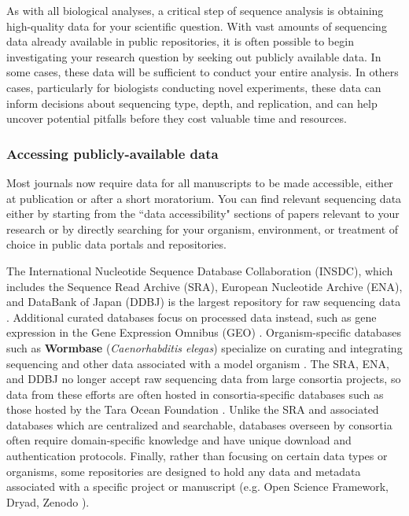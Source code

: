 \documentclass[10pt,letterpaper]{article}
\begin{document}
As with all biological analyses, a critical step of sequence analysis is obtaining high-quality data for your scientific question. 
With vast amounts of sequencing data already available in public repositories, it is often possible to begin investigating your research question by seeking out publicly available data. 
In some cases, these data will be sufficient to conduct your entire analysis. 
In others cases, particularly for biologists conducting novel experiments, these data can inform decisions about sequencing type, depth, and replication, and can help uncover potential pitfalls before they cost valuable time and resources.

\subsubsection*{Accessing publicly-available data}

Most journals now require data for all manuscripts to be made accessible, either at publication or after a short moratorium.
You can find relevant sequencing data either by starting from the ``data accessibility" sections of papers relevant to your research or by directly searching for your organism, environment, or treatment of choice in public data portals and repositories. 

The International Nucleotide Sequence Database Collaboration (INSDC), which includes the Sequence Read Archive (SRA), European Nucleotide Archive (ENA), and DataBank of Japan (DDBJ) is the largest repository for raw sequencing data \cite{cochrane2016international}. 
Additional curated databases focus on processed data instead, such as gene expression in the Gene Expression Omnibus (GEO) \cite{edgar2002gene}.  
Organism-specific databases such as \textbf{Wormbase} (\textit{Caenorhabditis elegas}) specialize on curating and integrating sequencing and other data associated with a model organism \cite{harris2020wormbase}. 
The SRA, ENA, and DDBJ no longer accept raw sequencing data from large consortia projects, so data from these efforts are often hosted in consortia-specific databases such as those hosted by the Tara Ocean Foundation \cite{pesant2015open}.
Unlike the SRA and associated databases which are centralized and searchable, databases overseen by consortia often require domain-specific knowledge and have unique download and authentication protocols.
Finally, rather than focusing on certain data types or organisms, some repositories are designed to hold any data and metadata associated with a specific project or manuscript (e.g. Open Science Framework, Dryad, Zenodo \cite{foster2017open}).
\end{document}
